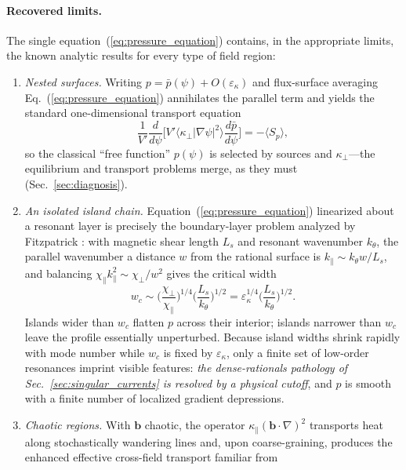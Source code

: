 \documentclass[english]{article}
\newcommand{\bb}{\mathbf{b}}
\begin{document}
\paragraph{Recovered limits.}
The single equation~(\ref{eq:pressure_equation}) contains, in the appropriate limits, the known
analytic results for every type of field region:
\begin{enumerate}
\item \emph{Nested surfaces.} Writing $p=\bar p(\psi)+O(\varepsilon_\kappa)$ and flux-surface
averaging Eq.~(\ref{eq:pressure_equation}) annihilates the parallel term and yields the standard
one-dimensional transport equation
\begin{equation}
\frac{1}{V'}\frac{d}{d\psi}\Big[V'\big\langle\kappa_\perp|\nabla\psi|^{2}\big\rangle
\frac{d\bar p}{d\psi}\Big]=-\langle S_p\rangle ,
\label{eq:1D_transport}
\end{equation}
so the classical ``free function'' $p(\psi)$ is selected by sources and $\kappa_\perp$---the
equilibrium and transport problems merge, as they must (Sec.~\ref{sec:diagnosis}).
\item \emph{An isolated island chain.} Equation~(\ref{eq:pressure_equation}) linearized about a
resonant layer is precisely the boundary-layer problem analyzed by Fitzpatrick
\cite{fitzpatrick1995}: with magnetic shear length $L_s$ and resonant wavenumber $k_\theta$, the
parallel wavenumber a distance $w$ from the rational surface is $k_\parallel\sim k_\theta w/L_s$,
and balancing $\chi_\parallel k_\parallel^{2}\sim\chi_\perp/w^{2}$ gives the critical width
\begin{equation}
w_c\sim\Big(\frac{\chi_\perp}{\chi_\parallel}\Big)^{1/4}
\Big(\frac{L_s}{k_\theta}\Big)^{1/2}
=\varepsilon_\kappa^{1/4}\Big(\frac{L_s}{k_\theta}\Big)^{1/2}.
\label{eq:wc}
\end{equation}
Islands wider than $w_c$ flatten $p$ across their interior; islands narrower than $w_c$ leave the
profile essentially unperturbed. Because island widths shrink rapidly with mode number while $w_c$
is fixed by $\varepsilon_\kappa$, only a finite set of low-order resonances imprint visible
features: \emph{the dense-rationals pathology of Sec.~\ref{sec:singular_currents} is resolved by a
physical cutoff}, and $p$ is smooth with a finite number of localized gradient depressions.
\item \emph{Chaotic regions.} With $\bb$ chaotic, the operator
$\kappa_\parallel(\bb\cdot\nabla)^{2}$ transports heat along stochastically wandering lines and,
upon coarse-graining, produces the enhanced effective cross-field transport familiar from

\end{enumerate}
\end{document}
